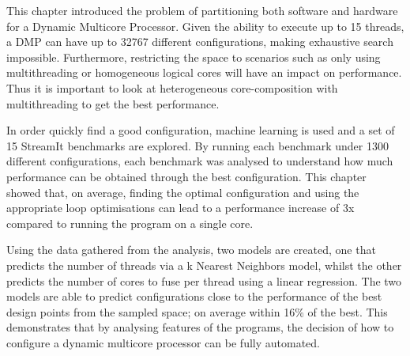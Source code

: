 This chapter introduced the problem of partitioning both software and hardware for a Dynamic Multicore Processor.
Given the ability to execute up to 15 threads, a DMP can have up to 32767 different configurations, making exhaustive search impossible.
Furthermore, restricting the space to scenarios such as only using multithreading or homogeneous logical cores will have an impact on performance.
Thus it is important to look at heterogeneous core-composition with multithreading to get the best performance.

In order quickly find a good configuration, machine learning is used and a set of 15 StreamIt benchmarks are explored.
By running each benchmark under 1300 different configurations, each benchmark was analysed to understand how much performance can be obtained through the best configuration.
This chapter showed that, on average, finding the optimal configuration and using the appropriate loop optimisations can lead to a performance increase of 3x compared to running the program on a single core.

Using the data gathered from the analysis, two models are created, one that predicts the number of threads via a k Nearest Neighbors model, whilst the other predicts the number of cores to fuse per thread using a linear regression.
The two models are able to predict configurations close to the performance of the best design points from the sampled space; on average within 16\% of the best.
This demonstrates that by analysing features of the programs, the decision of how to configure a dynamic multicore processor can be fully automated.